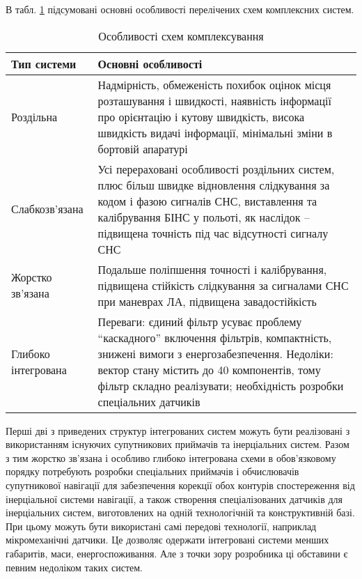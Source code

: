 В табл. \ref{tab:compare} підсумовані основні особливості перелічених схем комплексних систем.

\begin{table}[here]
\centering
\caption{Особливості схем комплексування}
\label{tab:compare}
\begin{tabular}{|p{30mm}|p{110mm}|} \hline 
Тип системи & Основні особливості \\ \hline 
Роздільна & Надмірність, обмеженість похибок оцінок місця розташування і швидкості, 
наявність інформації про орієнтацію і кутову швидкість, висока швидкість видачі інформації, 
мінімальні зміни в бортовій апаратурі  \\ \hline 

Слабко\newline зв'язана & Усі перераховані особливості роздільних систем, плюс більш 
швидке відновлення слідкування за кодом і фазою сигналів СНС, виставлення та калібрування 
БІНС у польоті, як наслідок -- підвищена точність під час відсутності сигналу СНС  \\ \hline 

Жорстко зв'язана & Подальше поліпшення точності і калібрування, підвищена стійкість слідкування 
за сигналами СНС при маневрах ЛА, підвищена завадостійкість  \\ \hline
 
Глибоко інтегрована & Переваги: єдиний фільтр усуває проблему ``каскадного'' включення 
фільтрів, компактність, знижені вимоги з енергозабезпечення. Недоліки: вектор стану 
містить до 40 компонентів, тому фільтр складно реалізувати; необхідність розробки 
спеціальних датчиків  \\ \hline 
\end{tabular}
\end{table}

Перші дві з приведених структур інтегрованих систем можуть бути реалізовані з використанням 
існуючих супутникових приймачів та інерціальних систем. Разом з тим жорстко зв'язана 
і особливо глибоко інтегрована схеми в обов'язковому порядку потребують розробки 
спеціальних приймачів і обчислювачів супутникової навігації для забезпечення корекції 
обох контурів спостереження від інерціальної системи навігації, а також створення 
спеціалізованих датчиків для інерціальних систем, виготовлених на одній технологічній 
та конструктивній базі. При цьому можуть бути використані самі передові технології, 
наприклад мікромеханічні датчики. Це дозволяє одержати інтегровані системи менших 
габаритів, маси, енергоспоживання. Але з точки зору розробника ці обставини є певним 
недоліком таких систем. 

